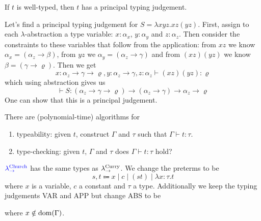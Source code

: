 \begin{boxthm}
    If $t$ is well-typed, then $t$ has a principal typing judgement.
\end{boxthm}

\begin{example}
    Let's find a principal typing judgement for $S = \lambda x y z. x z (y z)$.
    First, assign to each $\lambda$-abstraction a type variable: $x : \alpha_x$, $y : \alpha_y$ and $z : \alpha_z$.
    Then consider the constraints to these variables that follow from the application: from $xz$ we know $\alpha_x = (\alpha_z \to \beta)$, from $yz$ we $\alpha_y = (\alpha_z \to \gamma)$ and from $(xz)(yz)$ we know $\beta =(\gamma  \to \varrho)$.
    Then we get
    \begin{equation*}
        x : \alpha_z \to \gamma \to \varrho, y : \alpha_z \to \gamma, z : \alpha_z \vdash (xz)(yz) : \varrho
    \end{equation*}
    which using abstraction gives us
    \begin{equation*}
        \vdash S : (\alpha_z \to \gamma \to \varrho) \to (\alpha_z \to \gamma) \to \alpha_z \to \varrho
    \end{equation*}
    One can show that this is a principal judgement.
\end{example}

\begin{boxthm}
    There are (polynomial-time) algorithms for
    \begin{enumerate}
        \item typeability: given $t$, construct $\Gamma$ and $\tau$ such that $\Gamma \vdash t : \tau$.
        \item type-checking: given $t$, $\Gamma$ and $\tau$ does $\Gamma \vdash t : \tau$ hold?
    \end{enumerate}
\end{boxthm}

\begin{boxdefi}
    $\alert{\lamchu}$ has the same types as $\lamcur$.
    We change the \alert{preterms} to be
    \begin{equation*}
        s, t \Coloneqq x \mid c \mid (st) \mid \lambda x : \tau .t
    \end{equation*}
    where $x$ is a variable, $c$ a constant and $\tau$ a type.
    Additionally we keep the \alert{typing judgements} VAR and APP but change ABS to be
    \begin{prooftree}
    \end{prooftree}
    where $x \notin \domain{\Gamma}$.
\end{boxdefi}

